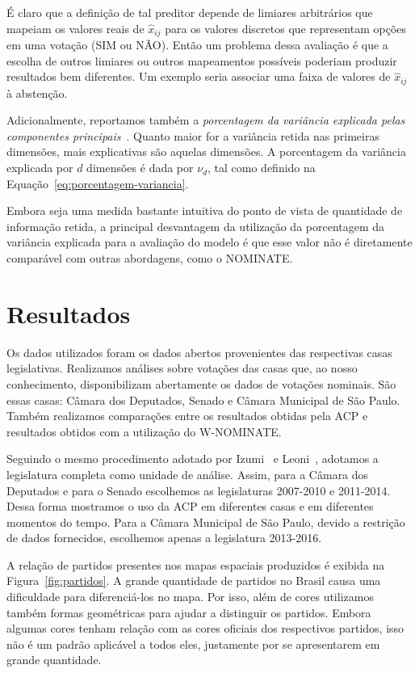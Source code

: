 \documentclass[
	article,			%
	12pt,				%
	oneside,			%
	a4paper,			%
	english,			%
	brazil,				%
	sumario=tradicional,
	oldfontcommands %
	]{abntex2}
\newcommand\nay{NÃO\xspace}
\newcommand\yea{SIM\xspace}
\newcommand\nominate{NOMINATE\xspace}
\newcommand\wnominate{W-NOMINATE\xspace}
\begin{document}
É claro que a definição de tal preditor depende de limiares arbitrários que mapeiam os valores reais de $\widehat{x}_{ij}$ para os valores discretos que representam opções em uma votação (\yea ou \nay). Então um problema dessa avaliação é que a escolha de outros limiares ou outros mapeamentos possíveis poderiam produzir resultados bem diferentes. Um exemplo seria associar uma faixa de valores de $\widehat{x}_{ij}$ à abstenção.

Adicionalmente, reportamos também a \emph{porcentagem da variância explicada pelas componentes principais}~\cite{DataMining2003}. Quanto maior for a variância retida nas primeiras dimensões, mais explicativas são aquelas dimensões. A porcentagem da variância explicada por $d$ dimensões é dada por $\nu_d$, tal como definido na Equação~\ref{eq:porcentagem-variancia}.

Embora seja uma medida bastante intuitiva do ponto de vista de quantidade de informação retida, a principal desvantagem da utilização da porcentagem da variância explicada para a avaliação do modelo é que esse valor não é diretamente comparável com outras abordagens, como o \nominate.

\section{Resultados}
\label{sec:resultados}

Os dados utilizados foram os dados abertos provenientes das respectivas casas legislativas. Realizamos análises sobre votações das casas que, ao nosso conhecimento, disponibilizam abertamente os dados de votações nominais. São essas casas: Câmara dos Deputados, Senado e Câmara Municipal de São Paulo. Também realizamos comparações entre os resultados obtidas pela ACP e resultados obtidos com a utilização do \wnominate.  

Seguindo o mesmo procedimento adotado por Izumi~\cite{izumi2016senado} e Leoni~\cite{leoni02cdep}, adotamos a legislatura completa como unidade de análise. Assim, para a Câmara dos Deputados e para o Senado escolhemos as legislaturas 2007-2010 e 2011-2014. Dessa forma mostramos o uso da ACP em diferentes casas e em diferentes momentos do tempo. Para a Câmara Municipal de São Paulo, devido a restrição de dados fornecidos, escolhemos apenas a legislatura 2013-2016. 

A relação de partidos presentes nos mapas espaciais produzidos é exibida na Figura~\ref{fig:partidos}. A grande quantidade de partidos no Brasil causa uma dificuldade para diferenciá-los no mapa. Por isso, além de cores utilizamos também formas geométricas para ajudar a distinguir os partidos. Embora algumas cores tenham relação com as cores oficiais dos respectivos partidos, isso não é um padrão aplicável a todos eles, justamente por se apresentarem em grande quantidade.
\end{document}
